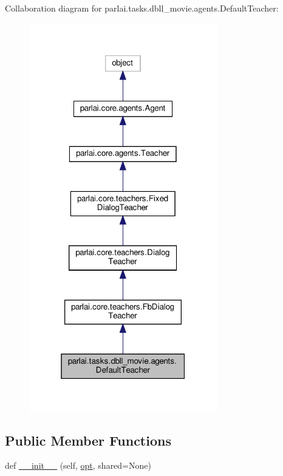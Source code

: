 Collaboration diagram for parlai.\+tasks.\+dbll\+\_\+movie.\+agents.\+Default\+Teacher\+:
\nopagebreak
\begin{figure}[H]
\begin{center}
\leavevmode
\includegraphics[width=232pt]{da/d7b/classparlai_1_1tasks_1_1dbll__movie_1_1agents_1_1DefaultTeacher__coll__graph}
\end{center}
\end{figure}
\subsection*{Public Member Functions}
\begin{DoxyCompactItemize}
\item 
def \hyperlink{classparlai_1_1tasks_1_1dbll__movie_1_1agents_1_1DefaultTeacher_a66c1dbd7bb3e1b49e3c145235f1fffa0}{\+\_\+\+\_\+init\+\_\+\+\_\+} (self, \hyperlink{classparlai_1_1core_1_1teachers_1_1FbDialogTeacher_af7a9ec497b9cd0292d7b8fa220da7c28}{opt}, shared=None)
\end{DoxyCompactItemize}
